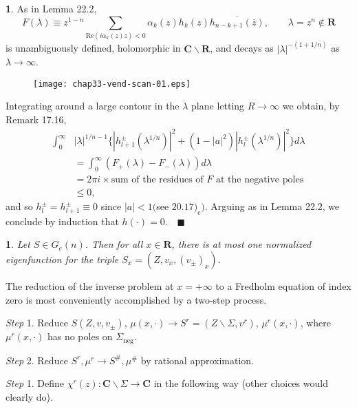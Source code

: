 \documentclass{surv-l}
\theoremstyle{plain}
\newtheorem{corollary}[theorem]{\sc{Corollary}}
\theoremstyle{definition}
\newtheorem*{pf}{\sc{Proof}}
\numberwithin{equation}{chapter}
\begin{document}
\begin{pf}
As in Lemma 22.2,
\begin{equation*}
F(\lambda)\equiv z^{1-n}\sum_{\mathrm{Re}(i\alpha_{k}(z)z)<0}\alpha_{k}(z)h_{k}(z)\overline{h_{n-k+1}(\overline{z})},\qquad \lambda=z^{n}\not\in \mathbf{R}
\end{equation*}
is unambiguously defined, holomorphic in $\mathbf{C}\backslash \mathbf{R}$, and decays as $|\lambda|^{-(1+1/n)}$ as $\lambda \rightarrow\infty$.
\begin{figure}
\texttt{[image: chap33-vend-scan-01.eps]}
\caption{}
\end{figure}


Integrating around a large contour in the $\lambda$ plane letting $ R\rightarrow\infty$ we obtain, by Remark 17.16,
\begin{align*}
\int_{0}^{\infty}&|\lambda|^{1/n-1}\{|h_{l+1}^{\pm}(\lambda^{1/n})|^{2}+(1-|a|^{2})|h_{l}^{\pm}(\lambda^{1/n})|^{2}\}d\lambda\\
&=\int_{0}^{\infty}(F_{+}(\lambda)-F_{-}(\lambda))d\lambda\\
&=2\pi i\times \text{sum of the residues of } F\text{ at the negative poles}\\
&\leq 0,
\end{align*}
and so $h_{l}^{\pm}=h_{l+1}^{\pm}\equiv 0$ since $|a|<1 ($see $20.17)_{\mathrm{c}})$. Arguing as in Lemma 22.2, we conclude by induction that $h(\cdot)=0.\quad \blacksquare$
\end{pf}
\setcounter{theorem}{15}
\begin{corollary}\label{coro33.16}
Let $S\in G_{e}(n)$. Then for all $x\in \mathbf{R}$, there is at most one normalized eigenfunction for the triple $S_{x}=(Z, v_{x}, (v_{\pm})_{x})$.\quad
\end{corollary}


The reduction of the inverse problem at $ x=+\infty$ to a Fredholm equation of index zero is most conveniently accomplished by a two-step process.

\emph{Step} 1. Reduce $S(Z,v, v_{\pm})$, $\mu(x, \cdot)\rightarrow S^{r}=(Z\backslash \Sigma, v^{r})$, $\mu^{r}(x,\cdot)$, where $\mu^{r}(x, \cdot)$ has no poles on $\Sigma_{\mathrm{neg}}$.

\emph{Step} 2. Reduce $S^{r},\mu^{r}\rightarrow S^{\#},\mu^{\#}$ by rational approximation.

\emph{Step} 1. Define $\chi^{r}(z):\mathbf{C}\backslash \Sigma\rightarrow \mathbf{C}$ in the following way (other choices would clearly do).
\end{document}
